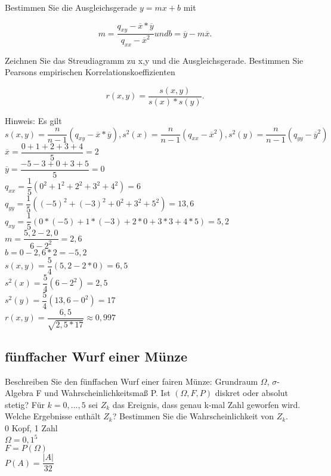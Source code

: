 \documentclass[paper=a4, fontsize=11pt]{scrartcl}
\numberwithin{equation}{section}
\numberwithin{figure}{section}
\numberwithin{table}{section}
\begin{document}
Bestimmen Sie die Ausgleichsgerade  $y=mx+b$ mit

$$m=\dfrac{q_{xy}-\overline{x}* \overline{y}}{q_{xx}- \overline{x}^{2}} und b= \overline{y} - m \overline{x}.$$

Zeichnen Sie das Streudiagramm zu x,y und die Ausgleichsgerade. Bestimmen Sie Pearsons empirischen Korrelationskoeffizienten

$$r(x,y)= \dfrac{s(x,y)}{s(x)*s(y)}.$$

Hinweis: Es gilt $s(x,y)=\dfrac{n}{n-1}(q_{xy}-\overline{x}* \overline{y}), s^{2}(x)=\dfrac{n}{n-1}(q_{xx}-\overline{x}^{2}), s^{2}(y)=\dfrac{n}{n-1}(q_{yy}-\overline{y}^{2})$ \\

$\overline{x}= \dfrac{0+1+2+3+4}{5} = 2$ \\
$\overline{y}= \dfrac{-5-3+0+3+5}{5} = 0$ \\

$q_{xx} = \dfrac{1}{5} (0^{2}+1^{2}+2^{2}+3^{2}+4^{2}) = 6$ \\
$q_{yy} = \dfrac{1}{5} ((-5)^{2}+(-3)^{2}+0^{2}+3^{2}+5^{2}) = 13,6$ \\
$q_{xy} = \dfrac{1}{5} (0*(-5)+1*(-3)+2*0+3*3+4*5)= 5,2$ \\

$m= \dfrac{5,2-2,0}{6-2^{2}} = 2,6$ \\
$b= 0-2,6*2= -5,2$ \\

$s(x,y)= \dfrac{5}{4} (5,2-2*0) =6,5$ \\
$s^{2}(x) = \dfrac{5}{4} (6-2^{2}) = 2,5$ \\
$s^{2}(y) = \dfrac{5}{4} (13,6-0^{2}) = 17$ \\

$r(x,y)= \dfrac{6,5}{\sqrt{2,5 * 17}} \approx 0,997$

\subsection{fünffacher Wurf einer Münze}
Beschreiben Sie den fünffachen Wurf einer fairen Münze: Grundraum $\Omega$, $\sigma$-Algebra F und Wahrscheinlichkeitsmaß P. Ist $(\Omega, F, P)$ diskret oder absolut stetig? Für $k=0,...,5$ sei $Z_{k}$ das Ereignis, dass genau k-mal Zahl geworfen wird. Welche Ergebnisse enthält $Z_{k}$? Bestimmen Sie die Wahrscheinlichkeit von $Z_{k}$. \\

0 Kopf, 1 Zahl \\
$\Omega = {0,1}^{5}$ \\
$F=P( \Omega)$ \\
$P(A)= \dfrac{|A|}{32}$ \\
\end{document}

